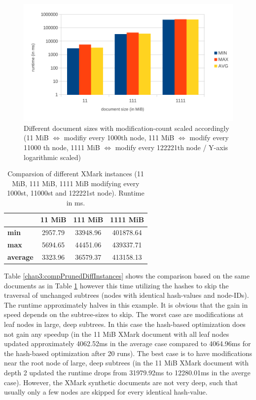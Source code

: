 \begin{figure}[tb]
\centering
\includegraphics[width=\textwidth]{figures/diff-docsize-scale}
\caption{Different document sizes with modification-count scaled accordingly (11 MiB $\Leftrightarrow$ modifiy every 1000th node, 111 MiB $\Leftrightarrow$ modify every 11000 th node, 1111 MiB $\Leftrightarrow$ modify every 122221th node / Y-axis logarithmic scaled)} 
\label{fig:docScaling}
\end{figure}

\begin{table}[tb]
\centering 
\begin{tabular}[r]{|l|c|c|c|} 
\hline
& \textbf{11 MiB} & \textbf{111 MiB} & \textbf{1111 MiB}\\
\hline
\hline
\textbf{min} & 2957.79 & 33948.96 & 401878.64\\
\hline
\textbf{max} & 5694.65 & 44451.06 & 439337.71\\
\hline
\textbf{average} & 3323.96 & 36579.37 & 413158.13\\
\hline
\end{tabular}
\label{chap3:compDiffInstances}
\vspace{0.5em} 
\caption{Comparsion of different XMark instances (11 MiB, 111 MiB, 1111 MiB modifying every 1000st, 11000st and 122221st node). Runtime in ms.}
\end{table}

Table \ref{chap3:compPrunedDiffInstances} shows the comparison based on the same documents as in Table \ref{chap3:compDiffInstances} however this time utilizing the hashes to skip the traversal of unchanged subtrees (nodes with identical hash-values and node-IDs). The runtime approximately halves in this example. It is obvious that the gain in speed depends on the subtree-sizes to skip. The worst case are modifications at leaf nodes in large, deep subtrees. In this case the hash-based optimization does not gain any speedup (in the 11 MiB XMark document with all leaf nodes updated approximately 4062.52ms in the average case compared to 4064.96ms for the hash-based optimization after 20 runs). The best case is to have modifications near the root node of large, deep subtrees (in the 11 MiB XMark document with depth 2 updated the runtime drops from 31979.92ms to 12280.01ms in the averge case). However, the XMark synthetic documents are not very deep, such that usually only a few nodes are skipped for every identical hash-value.

